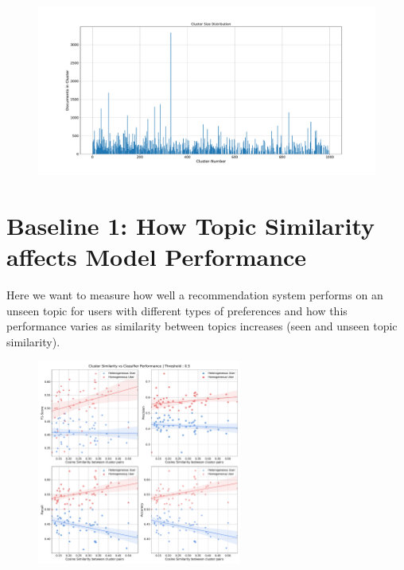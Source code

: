 \documentclass[a4paper,fontsize=9.0pt]{scrartcl}
\begin{document}
\begin{flushleft}
\begin{itemize}
\begin{itemize}
  \end{itemize}
\end{itemize}
\begin{figure}[H]
 \centering
 \includegraphics[width=1.0\textwidth]{Graphs/cluster_size_dist.pdf}
\end{figure}
\end{flushleft}


\newpage
\section{Baseline 1: How Topic Similarity affects Model Performance}
\begin{flushleft}
Here we want to measure how well a recommendation system performs on an unseen topic for users with different types of preferences and how this performance varies as similarity between topics increases (seen and unseen topic similarity).
\end{flushleft}
\vspace{-5ex}
\begin{figure}[H]
 \includegraphics[width=0.6\textwidth]{Graphs/cluster_sim_vs_model_perf_5.pdf}
\end{figure}
\end{document}
